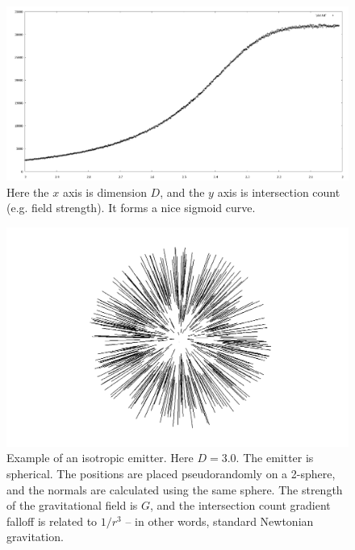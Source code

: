 \documentclass[12pt]{article}
\begin{document}
\begin{figure} 
\centering
  \includegraphics[width = 5 in]{transition.png}
  \caption{
Here the $x$ axis is dimension $D$, and the $y$ axis is intersection count (e.g. field strength).
It forms a nice sigmoid curve.
}
\end{figure}








\begin{figure} 
\centering
  \includegraphics[width = 5 in]{3.png}
  \caption{
Example of an isotropic emitter.
Here $D = 3.0$. 
The emitter is spherical.
The positions are placed pseudorandomly on a 2-sphere, and the normals are calculated using the same sphere.
The strength of the gravitational field is $G$, and the intersection count gradient falloff is related to $1/r^3$ -- in other words, standard Newtonian gravitation.
}
\end{figure}
\end{document}
